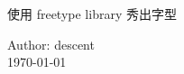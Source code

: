 \begin{titlepage}
\fontsize{30}{30pt plus.5pt minux.4pt}\selectfont
\noindent
使用 freetype library 秀出字型

\fontsize{14}{20pt plus.5pt minux.4pt}\selectfont
\par\vfill\noindent

Author: descent\\

\today


\end{titlepage}

